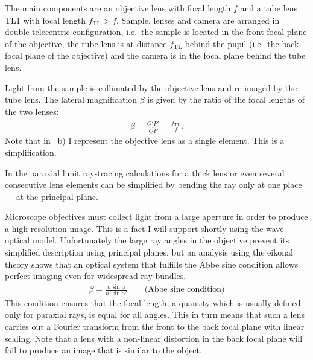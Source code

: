 The main components are an objective lens with focal length $f$ and a
 tube lens TL1 with focal length
$f_\textrm{TL}>f$. Sample, lenses and camera are arranged in
double-telecentric configuration, i.e.\ the sample is located in the
front focal plane of the objective, the tube lens is at distance
$f_\textrm{TL}$ behind the pupil (i.e.\ the back focal plane of the
objective) and the camera is in the focal plane behind the tube lens.




Light from the sample is collimated by the objective lens and
 re-imaged by the tube lens. The lateral
magnification $\beta$ is given by the ratio of the focal lengths of
the two lenses:
\begin{align}
  \beta=\frac{\overline{O'P'}}{\overline{OP}}=\frac{f_\mathrm{TL}}{f}.
\end{align}
Note that in ~b) I represent the
objective lens as a single element.  This is a simplification.

In the paraxial limit ray-tracing calculations for a thick lens or
even several consecutive lens elements can be simplified by bending
the ray only at one place --- at the principal plane.





Microscope objectives must collect light from a large aperture in
 order to produce a high
resolution image. This is a fact I will support shortly using the
wave-optical model. Unfortunately the large ray angles in the
objective prevent its simplified description using principal planes,
but an analysis using the eikonal theory \citep{Haferkorn1984} shows
that an optical system that fulfills the Abbe sine condition allows
perfect imaging even for widespread ray bundles.
\begin{align}
  \label{eq:sine-condition}
  \beta = \frac{n \sin\alpha}{n' \sin\alpha'} \qquad \textrm{(Abbe sine condition)}
\end{align}
This condition ensures that the focal length, a quantity which is
usually defined only for paraxial rays, is equal for all angles.  This
in turn means that such a lens carries out a Fourier transform from
the front to the back focal plane with linear scaling. Note that a
lens with a non-linear distortion in the back focal plane will fail to
produce an image that is similar to the object.

